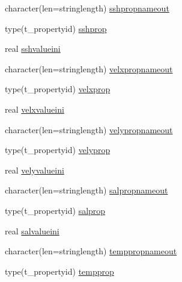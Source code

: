 \begin{DoxyCompactItemize}
character(len=stringlength) \mbox{\hyperlink{structmoduledelft3d__2__mohid_1_1t__delft3d__2__mohid_a6836964a791dc7f3a6dc1e77d7ad5e7f}{sshpropnameout}}
\item 
type(t\+\_\+propertyid) \mbox{\hyperlink{structmoduledelft3d__2__mohid_1_1t__delft3d__2__mohid_aee0c66ddfa321c044d8e678f7edf68e4}{sshprop}}
\item 
real \mbox{\hyperlink{structmoduledelft3d__2__mohid_1_1t__delft3d__2__mohid_afeba7d88dd01e5112ddc18dc00ff27ce}{sshvalueini}}
\item 
character(len=stringlength) \mbox{\hyperlink{structmoduledelft3d__2__mohid_1_1t__delft3d__2__mohid_abd6d8dc5a9daa48f3cdd793b62724a00}{velxpropnameout}}
\item 
type(t\+\_\+propertyid) \mbox{\hyperlink{structmoduledelft3d__2__mohid_1_1t__delft3d__2__mohid_a9e9c49d867b795dde2ae3f99a168c447}{velxprop}}
\item 
real \mbox{\hyperlink{structmoduledelft3d__2__mohid_1_1t__delft3d__2__mohid_abf63e46a85781347ac4e79eaa058ef12}{velxvalueini}}
\item 
character(len=stringlength) \mbox{\hyperlink{structmoduledelft3d__2__mohid_1_1t__delft3d__2__mohid_a4cbdfc4112fb99f673adc35ebf17e40d}{velypropnameout}}
\item 
type(t\+\_\+propertyid) \mbox{\hyperlink{structmoduledelft3d__2__mohid_1_1t__delft3d__2__mohid_abf5cae4243d49a7b78884e59d4bb1507}{velyprop}}
\item 
real \mbox{\hyperlink{structmoduledelft3d__2__mohid_1_1t__delft3d__2__mohid_a020148e008af9bf6a15d267b793e9a52}{velyvalueini}}
\item 
character(len=stringlength) \mbox{\hyperlink{structmoduledelft3d__2__mohid_1_1t__delft3d__2__mohid_a4e56286eeb7305b7bb5754dbc132e589}{salpropnameout}}
\item 
type(t\+\_\+propertyid) \mbox{\hyperlink{structmoduledelft3d__2__mohid_1_1t__delft3d__2__mohid_a2d18ecce4dd27e9fb76fd314ebdac2f0}{salprop}}
\item 
real \mbox{\hyperlink{structmoduledelft3d__2__mohid_1_1t__delft3d__2__mohid_aa2fb183421fcbddfd5e8c0657295bd94}{salvalueini}}
\item 
character(len=stringlength) \mbox{\hyperlink{structmoduledelft3d__2__mohid_1_1t__delft3d__2__mohid_a4f7d040bd16a18632ded5b772a74c1c0}{temppropnameout}}
\item 
type(t\+\_\+propertyid) \mbox{\hyperlink{structmoduledelft3d__2__mohid_1_1t__delft3d__2__mohid_ad233e15cfb34b7bf9fed9ea47b63cdd3}{tempprop}}
\item 

\end{DoxyCompactItemize}
